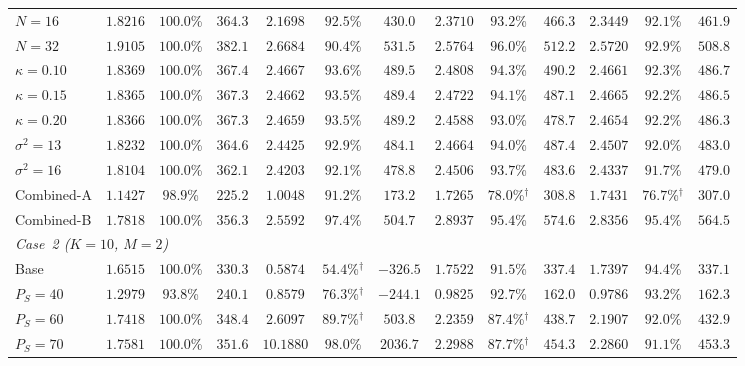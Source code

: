 \documentclass[12pt,onecolumn]{IEEEtran}
\begin{document}
\begin{table}[!t]
\begin{tabular}{lcccccccccccc}
\cmidrule(lr){1-13}
$N=16$ & $1.8216$ & $100.0$\% & $364.3$ & $2.1698$ & $92.5$\% & $430.0$ & $2.3710$ & $93.2$\% & $\mathbf{466.3}$ & $2.3449$ & $92.1$\% & $461.9$ \\
$N=32$ & $1.9105$ & $100.0$\% & $382.1$ & $2.6684$ & $90.4$\% & $\mathbf{531.5}$ & $2.5764$ & $96.0$\% & $512.2$ & $2.5720$ & $92.9$\% & $508.8$ \\
\cmidrule(lr){1-13}
$\kappa=0.10$ & $1.8369$ & $100.0$\% & $367.4$ & $2.4667$ & $93.6$\% & $489.5$ & $2.4808$ & $94.3$\% & $\mathbf{490.2}$ & $2.4661$ & $92.3$\% & $486.7$ \\
$\kappa=0.15$ & $1.8365$ & $100.0$\% & $367.3$ & $2.4662$ & $93.5$\% & $\mathbf{489.4}$ & $2.4722$ & $94.1$\% & $487.1$ & $2.4665$ & $92.2$\% & $486.5$ \\
$\kappa=0.20$ & $1.8366$ & $100.0$\% & $367.3$ & $2.4659$ & $93.5$\% & $\mathbf{489.2}$ & $2.4588$ & $93.0$\% & $478.7$ & $2.4654$ & $92.2$\% & $486.3$ \\
\cmidrule(lr){1-13}
$\sigma^2=13$ & $1.8232$ & $100.0$\% & $364.6$ & $2.4425$ & $92.9$\% & $484.1$ & $2.4664$ & $94.0$\% & $\mathbf{487.4}$ & $2.4507$ & $92.0$\% & $483.0$ \\
$\sigma^2=16$ & $1.8104$ & $100.0$\% & $362.1$ & $2.4203$ & $92.1$\% & $478.8$ & $2.4506$ & $93.7$\% & $\mathbf{483.6}$ & $2.4337$ & $91.7$\% & $479.0$ \\
\cmidrule(lr){1-13}
Combined-A & $1.1427$ & $98.9$\% & $225.2$ & $1.0048$ & $91.2$\% & $173.2$ & $1.7265$ & $78.0$\%$^{\dagger}$ & $\mathbf{308.8}$ & $1.7431$ & $76.7$\%$^{\dagger}$ & $307.0$ \\
Combined-B & $1.7818$ & $100.0$\% & $356.3$ & $2.5592$ & $97.4$\% & $504.7$ & $2.8937$ & $95.4$\% & $\mathbf{574.6}$ & $2.8356$ & $95.4$\% & $564.5$ \\
\cmidrule(lr){1-13}
\multicolumn{13}{l}{\emph{Case~2 ($K=10$, $M=2$)}} \\
Base & $1.6515$ & $100.0$\% & $330.3$ & $0.5874$ & $54.4$\%$^{\dagger}$ & $-326.5$ & $1.7522$ & $91.5$\% & $\mathbf{337.4}$ & $1.7397$ & $94.4$\% & $337.1$ \\
\cmidrule(lr){1-13}
$P_S=40$ & $1.2979$ & $93.8$\% & $\mathbf{240.1}$ & $0.8579$ & $76.3$\%$^{\dagger}$ & $-244.1$ & $0.9825$ & $92.7$\% & $162.0$ & $0.9786$ & $93.2$\% & $162.3$ \\
$P_S=60$ & $1.7418$ & $100.0$\% & $348.4$ & $2.6097$ & $89.7$\%$^{\dagger}$ & $\mathbf{503.8}$ & $2.2359$ & $87.4$\%$^{\dagger}$ & $438.7$ & $2.1907$ & $92.0$\% & $432.9$ \\
$P_S=70$ & $1.7581$ & $100.0$\% & $351.6$ & $10.1880$ & $98.0$\% & $\mathbf{2036.7}$ & $2.2988$ & $87.7$\%$^{\dagger}$ & $454.3$ & $2.2860$ & $91.1$\% & $453.3$ \\

\end{tabular}
\end{table}
\end{document}
